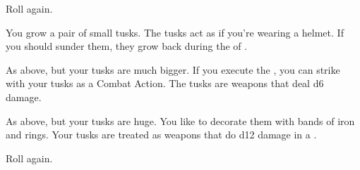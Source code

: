 \begin{multicols*}{2}
 Roll again.

\NC[Name=Tusky]

  You grow a pair of small tusks.  The tusks act as if you're wearing a helmet.  If you should sunder them, they grow back during the  of .

  As above, but your tusks are much bigger.  If you execute the , you can strike with your tusks as a Combat Action.  The tusks are \VIG weapons that deal d6 damage.

  As above, but your tusks are huge.  You like to decorate them with bands of iron and rings.  Your tusks are treated as \VIG weapons that do d12 damage in a .

  Roll again.

\newpage

\end{multicols*}
